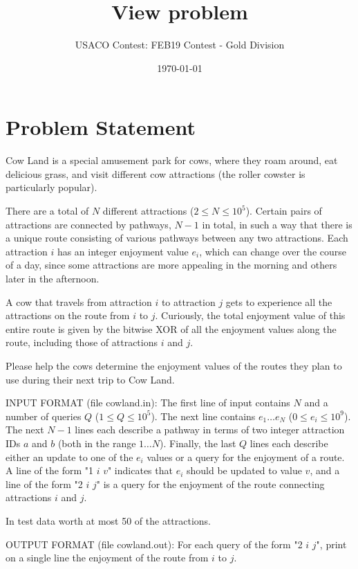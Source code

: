 \documentclass[12pt]{article}
\title{View problem}
\author{USACO Contest: FEB19 Contest - Gold Division}
\date{\today}
\begin{document}
\maketitle

\section*{Problem Statement}

Cow Land is a special amusement park for cows, where they roam around, eat
delicious grass, and visit different cow attractions (the roller cowster is
particularly popular).

There are a total of $N$ different attractions ($2 \leq N \leq 10^5$).  Certain
pairs of attractions are connected by pathways, $N-1$ in total, in such a way
that there is a unique route consisting of various pathways between any two
attractions. Each attraction $i$ has an integer enjoyment value $e_i$, which can
change over the course of a day, since some attractions are more appealing in
the morning and others later in the afternoon.

A cow that travels from attraction $i$ to attraction $j$ gets to experience all
the attractions on the route from $i$ to $j$.  Curiously, the total enjoyment
value of this entire route is given by the bitwise XOR of all the enjoyment
values along the route, including those of attractions $i$ and $j$.  

Please help the cows determine the enjoyment values of the routes they plan to
use during their next trip to Cow Land.

INPUT FORMAT (file cowland.in):
The first line of input contains $N$ and a number of queries $Q$
($1 \leq Q \leq 10^5$). The next line contains $e_1 \ldots e_N$
($0 \leq e_i \leq 10^9$).  The next $N-1$ lines each describe a pathway in terms
of two integer attraction IDs $a$ and $b$ (both in the range $1 \ldots N$). 
Finally, the last $Q$ lines each describe either an update to one of the $e_i$
values or a query for the enjoyment of a route.  A line of the form "1 $i$ $v$"
indicates  that $e_i$ should be updated to value $v$, and a line of the form "2
$i$ $j$" is a query for the enjoyment of the route connecting attractions $i$
and $j$.

In test data worth at most 50%
of the attractions.

OUTPUT FORMAT (file cowland.out):
For each query of the form "2 $i$ $j$", print on a single line the enjoyment of
the route from $i$ to $j$.
\end{document}
